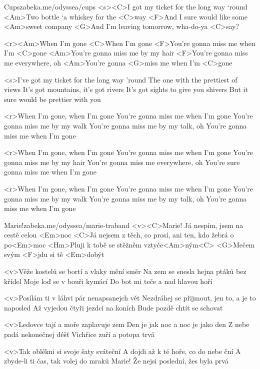 \begin{song}{50}{Cups}{zabeka.me/odyssea/cups}
<s><C>I got my ticket for the long way ‘round 
<Am>Two bottle ‘a whiskey for the <C>way
<F>And I sure would like some <Am>sweet company
<G>And I’m leaving tomorrow, wha-do-ya <C>say?

<r><Am>When I’m gone
<C>When I’m gone
<F>You’re gonna miss me when I’m <C>gone
<Am>You’re gonna miss me by my hair
<F>You’re gonna miss me everywhere, oh
<Am>You’re gonna <G>miss me when I’m <C>gone

<s>I've got my ticket for the long way 'round
The one with the prettiest of views
It's got mountains, it's got rivers
It's got sights to give you shivers
But it sure would be prettier with you

<r>When I'm gone, when I'm gone
You're gonna miss me when I'm gone
You're gonna miss me by my walk
You're gonna miss me by my talk, oh
You're gonna miss me when I'm gone

<r>When I'm gone, when I'm gone
You're gonna miss me when I'm gone
You're gonna miss me by my hair
You're gonna miss me everywhere, oh
You're sure gonna miss me when I'm gone

<r>When I'm gone, when I'm gone
You're gonna miss me when I'm gone
You're gonna miss me by my walk
You're gonna miss me by my talk, oh
You're gonna miss me when I'm gone
\end{song}
\begin{song}[Traband]{51}{Marie!}{zabeka.me/odyssea/marie-traband}
<v><C>Marie! Já nespím, jsem na cestě celou <Em>noc 
<C>Já nejsem z těch, co prosí, ani ten, kdo žebrá o po<Em>moc 
<Hm>Pluji k tobě se stěžněm vztyče<Am>ným<C> 
<G>Mečem svým <F>jdu si tě <Em>dobýt 

<v>Věže kostelů se bortí a vlaky mění směr 
Na zem se snesla hejna ptáků bez křídel 
Moje loď se v bouři kymácí 
Do bot mi teče a nad hlavou hoří 

<v>Posílám ti v láhvi pár nenapsanejch vět 
Nezdráhej se přijmout, jen to, a je to naposled 
Až vyjedou čtyři jezdci na koních 
Bude pozdě chtít se schovat 

<v>Ledovce tají a moře zaplavuje zem 
Den je jak noc a noc je jako den 
Z nebe padá nekonečnej déšť 
Vichřice zuří a potopa trvá 

<v>Tak oblékni si svoje šaty sváteční 
A dojdi až k té hoře, co do nebe ční 
A zbyde-li ti čas, tak volej do mraků 
Marie! Že nejsi poslední, žes byla prvá
\end{song}
